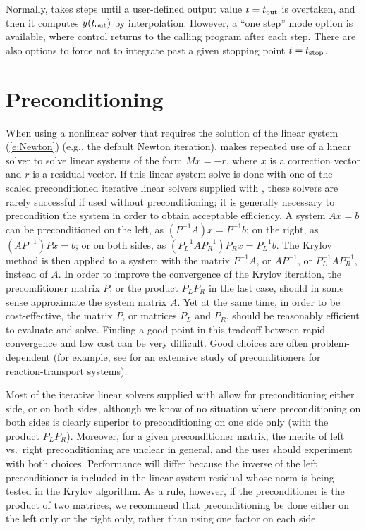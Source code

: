 Normally, {\cvodes} takes steps until a user-defined output value
$t = t_{\mbox{\scriptsize out}}$ is overtaken, and then it computes
$y(t_{\mbox{\scriptsize out}})$ by interpolation.  However, a
``one step'' mode option is available, where control returns to the
calling program after each step.  There are also options to force
{\cvodes} not to integrate past a given stopping point
$t = t_{\mbox{\scriptsize stop}}$.

\section{Preconditioning}\label{s:preconditioning}
When using a nonlinear solver that requires the solution of the linear system
(\ref{e:Newton}) (e.g., the default Newton iteration),
{\cvodes} makes repeated use of a linear solver to solve linear systems of the form
$M x = - r$, where $x$ is a correction vector and $r$ is a residual vector.
If this linear system solve is done with one of the scaled preconditioned iterative
linear solvers supplied with {\sundials}, these solvers are rarely successful if used without preconditioning;
it is generally necessary to precondition the system in order to obtain acceptable efficiency.
A system $A x = b$ can be preconditioned on the left, as $(P^{-1}A) x = P^{-1} b$;
on the right, as $(A P^{-1}) P x = b$; or on both sides, as
$(P_L^{-1} A P_R^{-1}) P_R x = P_L^{-1}b$.  The Krylov method is then
applied to a system with the matrix $P^{-1}A$, or $AP^{-1}$, or
$P_L^{-1} A P_R^{-1}$, instead of $A$.  In order to improve the
convergence of the Krylov iteration, the preconditioner matrix $P$, or
the product $P_L P_R$ in the last case, should in some sense
approximate the system matrix $A$.  Yet at the same time, in order to
be cost-effective, the matrix $P$, or matrices $P_L$ and $P_R$, should
be reasonably efficient to evaluate and solve.  Finding a good point
in this tradeoff between rapid convergence and low cost can be very
difficult.  Good choices are often problem-dependent (for example, see
\cite{BrHi:89} for an extensive study of preconditioners for
reaction-transport systems).

Most of the iterative linear solvers supplied with {\sundials} allow
for preconditioning either side, or on both sides, although we know of
no situation where preconditioning on both sides is clearly superior to
preconditioning on one side only (with the product $P_L P_R$).
Moreover, for a given preconditioner matrix, the merits of left vs.~right
preconditioning are unclear in general, and the user should experiment
with both choices.  Performance will differ because the inverse of the
left preconditioner is included in the linear system residual whose
norm is being tested in the Krylov algorithm.  As a rule, however, if
the preconditioner is the product of two matrices, we recommend that
preconditioning be done either on the left only or the right only,
rather than using one factor on each side.

